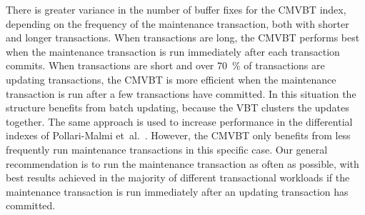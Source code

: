 There is greater variance in the number of buffer fixes for the CMVBT index,
depending on the frequency of the maintenance transaction, both with shorter
and longer transactions.
When transactions are long, the CMVBT performs best when the maintenance
transaction is run immediately after each transaction commits.
When transactions are short and over \SI{70}{\percent} of transactions are
updating transactions, the CMVBT is more efficient when the maintenance
transaction is run after a few transactions have committed.
In this situation the structure benefits from batch updating, because the VBT
clusters the updates together.
The same approach is used to increase performance in the differential
indexes of Pollari-Malmi et~al.~\cite{pollari-malmi:2000:differential-index}.
However, the CMVBT only benefits from less frequently run maintenance
transactions in this specific case.
Our general recommendation is to run the maintenance transaction as
often as possible, with best results achieved in the majority of different
transactional workloads if the maintenance transaction is run immediately
after an updating transaction has committed.

\begin{figure}[!htb]
\begin{center}
\label{fig:qu-initial-read}
\end{center}
\end{figure}

